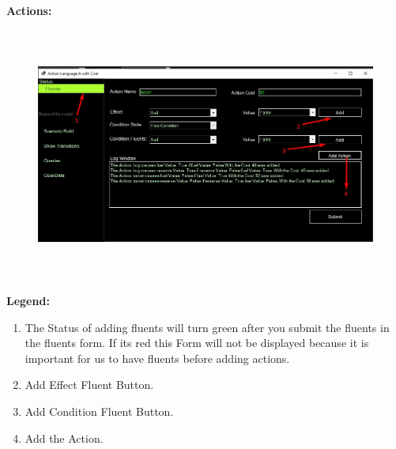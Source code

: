 \documentclass[12pt]{article}
\begin{document}
\vspace{\baselineskip}
\textbf{Actions:}\par


\vspace{\baselineskip}



\begin{figure}[H]
	\begin{Center}
		\includegraphics[width=6.26in,height=3.28in]{./media/image6.jpeg}
	\end{Center}
\end{figure}



\par


\vspace{\baselineskip}

\vspace{\baselineskip}

\vspace{\baselineskip}

\vspace{\baselineskip}
\textbf{Legend:}\par


\vspace{\baselineskip}
\begin{enumerate}
	\item The Status of adding fluents will turn green after you submit the fluents in the fluents form. If its red this Form will not be displayed because it is important for us to have fluents before adding actions.\par

	\item Add Effect Fluent Button.\par

	\item Add Condition Fluent Button.\par

	\item Add the Action.
\end{enumerate}\par
\end{document}

